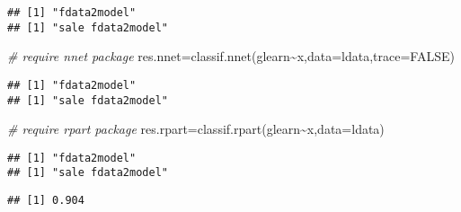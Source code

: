 \documentclass[
]{book}
\newenvironment{Shaded}{\begin{snugshade}}{\end{snugshade}}
\newcommand{\AttributeTok}[1]{\textcolor[rgb]{0.77,0.63,0.00}{#1}}
\newcommand{\CommentTok}[1]{\textcolor[rgb]{0.56,0.35,0.01}{\textit{#1}}}
\newcommand{\ConstantTok}[1]{\textcolor[rgb]{0.00,0.00,0.00}{#1}}
\newcommand{\DecValTok}[1]{\textcolor[rgb]{0.00,0.00,0.81}{#1}}
\newcommand{\FunctionTok}[1]{\textcolor[rgb]{0.00,0.00,0.00}{#1}}
\newcommand{\NormalTok}[1]{#1}
\newcommand{\OtherTok}[1]{\textcolor[rgb]{0.56,0.35,0.01}{#1}}
\newcommand{\SpecialCharTok}[1]{\textcolor[rgb]{0.00,0.00,0.00}{#1}}
\begin{document}
\begin{verbatim}
## [1] "fdata2model"
## [1] "sale fdata2model"
\end{verbatim}

\begin{Shaded}
\begin{Highlighting}[]
\CommentTok{\# require nnet package}
\NormalTok{res.nnet}\OtherTok{=}\FunctionTok{classif.nnet}\NormalTok{(glearn}\SpecialCharTok{\textasciitilde{}}\NormalTok{x,}\AttributeTok{data=}\NormalTok{ldata,}\AttributeTok{trace=}\ConstantTok{FALSE}\NormalTok{)}
\end{Highlighting}
\end{Shaded}

\begin{verbatim}
## [1] "fdata2model"
## [1] "sale fdata2model"
\end{verbatim}

\begin{Shaded}
\begin{Highlighting}[]
\CommentTok{\# require rpart package}
\NormalTok{res.rpart}\OtherTok{=}\FunctionTok{classif.rpart}\NormalTok{(glearn}\SpecialCharTok{\textasciitilde{}}\NormalTok{x,}\AttributeTok{data=}\NormalTok{ldata)}
\end{Highlighting}
\end{Shaded}

\begin{verbatim}
## [1] "fdata2model"
## [1] "sale fdata2model"
\end{verbatim}

\begin{Shaded}
\end{Shaded}

\begin{verbatim}
## [1] 0.904
\end{verbatim}

\begin{Shaded}
\end{Shaded}
\end{document}

